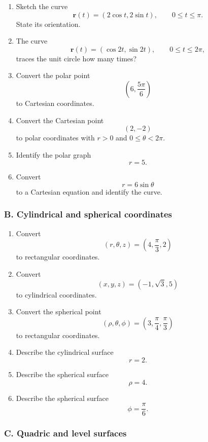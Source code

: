 \begin{enumerate}
\item Sketch the curve
\[
    \mathbf r(t)=(2\cos t,2\sin t),
    \qquad 0\le t\le\pi.
\]
State its orientation.

\item The curve
\[
    \mathbf r(t)=(\cos 2t,\sin 2t),
    \qquad 0\le t\le2\pi,
\]
traces the unit circle how many times?

\item Convert the polar point
\[
    \left(6,\frac{5\pi}{6}\right)
\]
to Cartesian coordinates.

\item Convert the Cartesian point
\[
    (2,-2)
\]
to polar coordinates with \(r>0\) and \(0\le\theta<2\pi\).

\item Identify the polar graph
\[
    r=5.
\]

\item Convert
\[
    r=6\sin\theta
\]
to a Cartesian equation and identify the curve.
\end{enumerate}

\subsubsection*{B. Cylindrical and spherical coordinates}

\begin{enumerate}
\item Convert
\[
    (r,\theta,z)=\left(4,\frac{\pi}{3},2\right)
\]
to rectangular coordinates.

\item Convert
\[
    (x,y,z)=(-1,\sqrt3,5)
\]
to cylindrical coordinates.

\item Convert the spherical point
\[
    \left(\rho,\theta,\phi\right)
    =
    \left(3,\frac{\pi}{4},\frac{\pi}{3}\right)
\]
to rectangular coordinates.

\item Describe the cylindrical surface
\[
    r=2.
\]

\item Describe the spherical surface
\[
    \rho=4.
\]

\item Describe the spherical surface
\[
    \phi=\frac{\pi}{6}.
\]
\end{enumerate}

\subsubsection*{C. Quadric and level surfaces}

